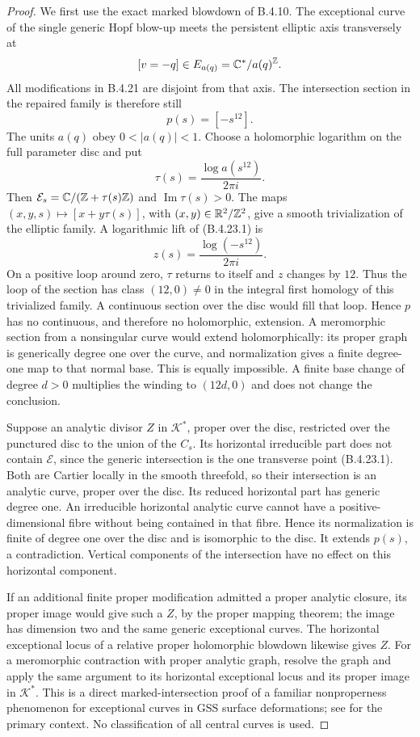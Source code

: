 \begin{proof}
We first use the exact marked blowdown of B.4.10.
The exceptional curve of the single generic Hopf blow-up
meets the persistent elliptic axis transversely at
\[
 [v=-q]\in E_{a(q)}=\mathbb C^*/a(q)^{\mathbb Z}.
\]
All modifications in B.4.21 are disjoint from that axis.
The intersection section in the repaired family is therefore
still
\[
 p(s)=[-s^{12}].                                      \tag{B.4.23.1}
\]
The units $a(q)$ obey $0<|a(q)|<1$. Choose a holomorphic
logarithm on the full parameter disc and put
\[
 \tau(s)=\frac{\log a(s^{12})}{2\pi i}.
\]
Then $\mathcal E_s=\mathbb C/(\mathbb Z+\tau(s)\mathbb Z)$ and
$\operatorname{Im}\tau(s)>0$. The maps
$(x,y,s)\mapsto[x+y\tau(s)]$, with $(x,y)\in\mathbb R^2/\mathbb Z^2$,
give a smooth trivialization of the elliptic family.
A logarithmic lift of (B.4.23.1) is
\[
 z(s)=\frac{\log(-s^{12})}{2\pi i}.
\]
On a positive loop around zero, $\tau$ returns to itself
and $z$ changes by $12$. Thus the loop of the section has
class $(12,0)\ne0$ in the integral first homology of this
trivialized family. A continuous section over the disc
would fill that loop. Hence $p$ has no continuous, and
therefore no holomorphic, extension. A meromorphic section
from a nonsingular curve would extend holomorphically:
its proper graph is generically degree one over the curve,
and normalization gives a finite degree-one map to that
normal base. This is equally impossible. A finite base
change of degree $d>0$ multiplies the winding to $(12d,0)$
and does not change the conclusion.

Suppose an analytic divisor $Z$ in $\mathcal K^*$, proper
over the disc, restricted over the punctured disc to the
union of the $C_s$. Its horizontal irreducible part does
not contain $\mathcal E$, since the generic intersection
is the one transverse point (B.4.23.1). Both are Cartier
locally in the smooth threefold, so their intersection
is an analytic curve, proper over the disc. Its reduced
horizontal part has generic degree one. An irreducible
horizontal analytic curve cannot have a positive-dimensional
fibre without being contained in that fibre. Hence its
normalization is finite of degree one over the disc and
is isomorphic to the disc. It extends $p(s)$, a
contradiction. Vertical components of the intersection
have no effect on this horizontal component.

If an additional finite proper modification admitted a
proper analytic closure, its proper image would give
such a $Z$, by the proper mapping theorem; the image has
dimension two and the same generic exceptional curves.
The horizontal exceptional locus of a relative proper
holomorphic blowdown likewise gives $Z$. For a meromorphic
contraction with proper analytic graph, resolve the graph
and apply the same argument to its horizontal exceptional
locus and its proper image in $\mathcal K^*$.
This is a direct marked-intersection proof of a familiar
nonproperness phenomenon for exceptional curves in GSS
surface deformations; see
\citet[Section 1.2]{DlousskyTeleman2012AB} for the primary
context. No classification of all central curves is used.


\end{proof}
